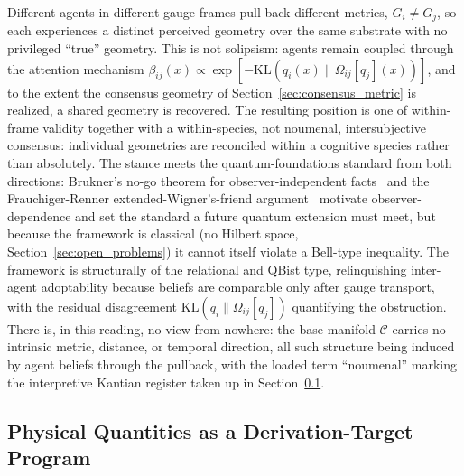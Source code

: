 \documentclass[11pt]{article}
\begin{document}
Different agents in different gauge frames pull back different metrics, $G_i \neq G_j$, so each experiences a distinct perceived geometry over the same substrate with no privileged ``true'' geometry. This is not solipsism: agents remain coupled through the attention mechanism $\beta_{ij}(x) \propto \exp[-\mathrm{KL}(q_i(x) \| \Omega_{ij}[q_j](x))]$, and to the extent the consensus geometry of Section~\ref{sec:consensus_metric} is realized, a shared geometry is recovered. The resulting position is one of within-frame validity together with a within-species, not noumenal, intersubjective consensus: individual geometries are reconciled within a cognitive species rather than absolutely. The stance meets the quantum-foundations standard from both directions: Brukner's no-go theorem for observer-independent facts~\cite{Brukner2018} and the Frauchiger-Renner extended-Wigner's-friend argument~\cite{frauchiger2018quantum} motivate observer-dependence and set the standard a future quantum extension must meet, but because the framework is classical (no Hilbert space, Section~\ref{sec:open_problems}) it cannot itself violate a Bell-type inequality. The framework is structurally of the relational and QBist type, relinquishing inter-agent adoptability because beliefs are comparable only after gauge transport, with the residual disagreement $\mathrm{KL}(q_i \| \Omega_{ij}[q_j])$ quantifying the obstruction. There is, in this reading, no view from nowhere: the base manifold $\mathcal{C}$ carries no intrinsic metric, distance, or temporal direction, all such structure being induced by agent beliefs through the pullback, with the loaded term ``noumenal'' marking the interpretive Kantian register taken up in Section~\ref{sec:phenomenological_interpretation}.

\subsection{Physical Quantities as a Derivation-Target Program}
\label{sec:phenomenological_interpretation}
\end{document}

